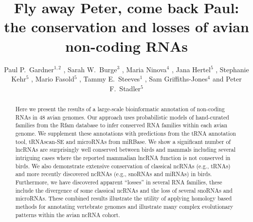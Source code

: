 \documentclass[10pt]{bmc_article}
\newenvironment{bmcformat}{\begin{raggedright}\baselineskip20pt\sloppy\setboolean{publ}{false}}{\end{raggedright}\baselineskip20pt\sloppy}
\begin{document}
\begin{bmcformat}

\title{Fly away Peter, come back Paul: the conservation and losses of avian non-coding RNAs}

\author{
Paul P.\ Gardner\correspondingauthor$^{1,2}$
,
Sarah W.\ Burge$^3$
,
Maria Ninova$^4$
,
Jana Hertel$^5$
,
Stephanie Kehr$^5$
,
Mario Fasold$^5$
,
Tammy E.\ Steeves$^1$
,
Sam Griffiths-Jones$^4$
and
Peter F.\ Stadler\correspondingauthor$^5$
}
\address{
\iid(1) School of Biological Sciences, University of Canterbury, Private Bag 4800, Christchurch, New Zealand.
\iid(2) Biomolecular Interaction Centre, University of Canterbury, Private Bag 4800, Christchurch, New Zealand.
\iid(3) European Molecular Biology Laboratory, European Bioinformatics Institute, Hinxton, Cambridge, CB10 1SD, UK.
\iid(4) Faculty of Life Sciences, University of Manchester, Manchester, United Kingdom.
\iid(5) Bioinformatics Group, Department of Computer Science; and Interdisciplinary Center for Bioinformatics, University of Leipzig, H{\"a}rtelstrasse 16-18, D-04107 Leipzig, Germany
}

\maketitle

\begin{abstract}
Here we present the results of a large-scale bioinformatic annotation
of non-coding RNAs in 48 avian genomes. Our approach uses
probabilistic models of hand-curated families from the Rfam database
to infer conserved RNA families within each avian genome. We
supplement these annotations with predictions from the tRNA annotation
tool, tRNAscan-SE and microRNAs from miRBase.  We show a significant
number of lncRNAs are surprisingly well conserved between birds and
mammals including several intriguing cases where the reported
mammalian lncRNA function is not conserved in birds.  We also
demonstrate extensive conservation of classical ncRNAs (e.g., tRNAs)
and more recently discovered ncRNAs (e.g., snoRNAs and miRNAs) in
birds. Furthermore, we have discovered apparent ``losses'' in several
RNA families, these include the divergence of some classical ncRNAs
and the loss of several snoRNAs and microRNAs.  These combined results
illustrate the utility of applying homology based methods for
annotating vertebrate genomes and illustrate many complex evolutionary
patterns within the avian ncRNA cohort.
\end{abstract}


\end{bmcformat}
\end{document}
